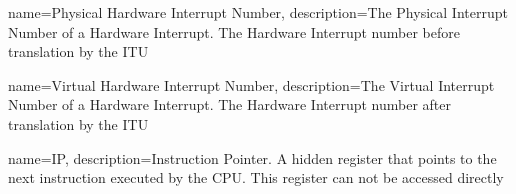 
{
  name=Physical Hardware Interrupt Number,
  description={The Physical Interrupt Number of a Hardware Interrupt. The Hardware Interrupt number before translation by the ITU}
}

{
  name=Virtual Hardware Interrupt Number,
  description={The Virtual Interrupt Number of a Hardware Interrupt. The Hardware Interrupt number after translation by the ITU}
}

{
  name=IP,
  description={Instruction Pointer. A hidden register that points to the next instruction executed by the CPU. This register can not be accessed directly}
}
